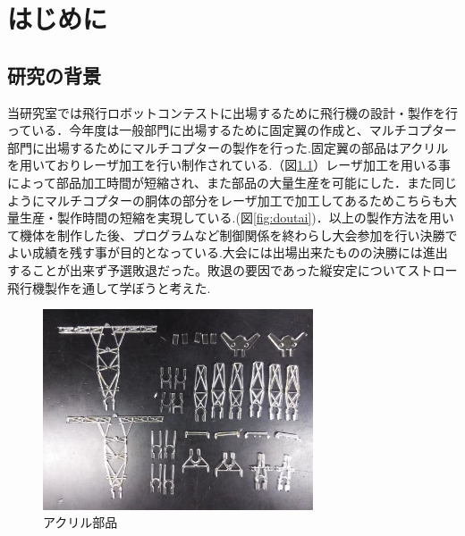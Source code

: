 \chapter{はじめに}

\section{研究の背景}
当研究室では飛行ロボットコンテストに出場するために飛行機の設計・製作を行っている．今年度は一般部門に出場するために固定翼の作成と、マルチコプター部門に出場するためにマルチコプターの製作を行った.固定翼の部品はアクリルを用いておりレーザ加工を行い制作されている.（図\ref{fig:acril}）レーザ加工を用いる事によって部品加工時間が短縮され、また部品の大量生産を可能にした．また同じようにマルチコプターの胴体の部分をレーザ加工で加工してあるためこちらも大量生産・製作時間の短縮を実現している.(図\ref{fig:doutai})．以上の製作方法を用いて機体を制作した後、プログラムなど制御関係を終わらし大会参加を行い決勝でよい成績を残す事が目的となっている.大会には出場出来たものの決勝には進出することが出来ず予選敗退だった。敗退の要因であった縦安定についてストロー飛行機製作を通して学ぼうと考えた.
\begin{figure}[htbp]
  \begin{center}
    \includegraphics[width=80mm]{acril.jpg}
    \end{center}
  \caption{アクリル部品}
 \label{fig:acril}
\end{figure}

